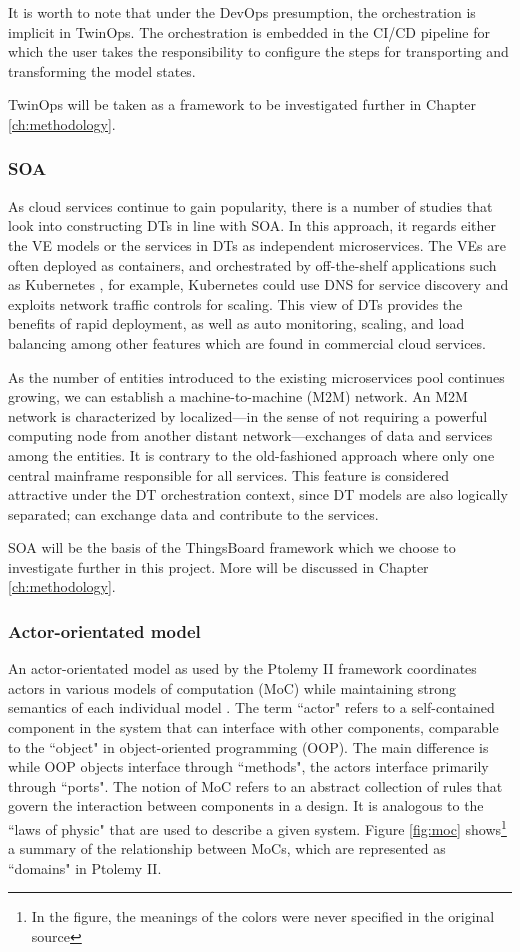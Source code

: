 It is worth to note that under the DevOps presumption, the orchestration is implicit in TwinOps. The orchestration is embedded in the CI/CD pipeline for which the user takes the responsibility to configure the steps for transporting and transforming the model states.

TwinOps will be taken as a framework to be investigated further in Chapter \ref{ch:methodology}.

\subsubsection{SOA} 
As cloud services continue to gain popularity, there is a number of studies \cite{Preuveneers2018, Borghesi2021, Hung2022} that look into constructing DTs in line with SOA. In this approach, it regards either the VE models or the services in DTs as independent microservices. The VEs are often deployed as containers, and orchestrated by off-the-shelf applications such as Kubernetes \cite{Kubernetes}, for example, Kubernetes could use DNS for service discovery and exploits network traffic controls for scaling. This view of DTs provides the benefits of rapid deployment, as well as auto monitoring, scaling, and load balancing among other features which are found in commercial cloud services. 

As the number of entities introduced to the existing microservices pool continues growing, we can establish a machine-to-machine (M2M) network. An M2M network is characterized by localized---in the sense of not requiring a powerful computing node from another distant network---exchanges of data and services among the entities. It is contrary to the old-fashioned approach where only one central mainframe responsible for all services. This feature is considered attractive under the DT orchestration context, since DT models are also logically separated; can exchange data and contribute to the services. 

SOA will be the basis of the ThingsBoard framework which we choose to investigate further in this project. More will be discussed in Chapter \ref{ch:methodology}.

\subsubsection{Actor-orientated model}
An actor-orientated model as used by the Ptolemy II framework coordinates actors in various models of computation (MoC) while maintaining strong semantics of each individual model \cite{Ptolemaeus2014}. The term ``actor" refers to a self-contained component in the system that can interface with other components, comparable to the ``object" in object-oriented programming (OOP). The main difference is while OOP objects interface through ``methods", the actors interface primarily through ``ports". The notion of MoC refers to an abstract collection of rules that govern the interaction between components in a design. It is analogous to the ``laws of physic" that are used to describe a given system. Figure \ref{fig:moc} shows\footnote{In the figure, the meanings of the colors were never specified in the original source} a summary of the relationship between MoCs, which are represented as ``domains" in Ptolemy II.

